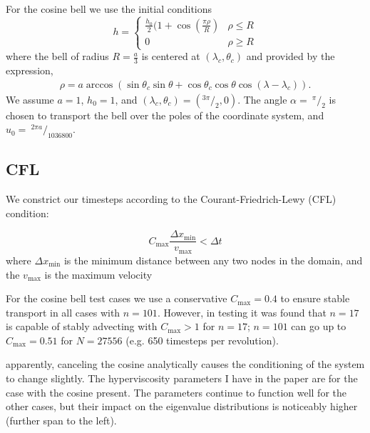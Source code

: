 \documentclass{report}
\begin{document}
For the cosine bell we use the initial conditions
\begin{equation*}
h  = 
\begin{cases} 
\frac{h_0}{2} (1 + \cos(\frac{\pi \rho}{R})  & \rho \le R  \\
 0 &  \rho \geq R 
\end{cases}
\end{equation*}
where the bell of radius $R = \frac{a}{3}$ is centered at $(\lambda_c, \theta_c)$ and provided by the expression,
\begin{eqnarray*}
\rho = a \arccos( \sin \theta_{c} \sin \theta + \cos \theta_{c} \cos \theta \cos (\lambda - \lambda_{c}) ).
\end{eqnarray*}
We assume $a = 1$, $h_0 = 1$, and $(\lambda_c, \theta_c) = (^{3\pi}/_{2}, 0)$. The angle $\alpha =\ ^{\pi}/_{2}$ is chosen to transport the bell over the poles of the coordinate system, and $u_0 =\ ^{2 \pi a}/_{1036800}$. 



\subsection{CFL}
We constrict our timesteps according to the Courant-Friedrich-Lewy (CFL) condition: 

$$
C_{\text{max}} \frac{\Delta x_{\text{min}}}{v_{\text{max}}} < \Delta t
$$
where $\Delta x_{\text{min}}$ is the minimum distance between any two nodes in the domain, and the $v_{\text{max}}$ is the maximum velocity 

For the cosine bell test cases we use a conservative $C_{\text{max}} = 0.4$ to ensure stable transport in all cases with $n=101$. However, in testing it was found that $n=17$ is capable of stably advecting with $C_{\text{max}} > 1$ for $n=17$; $n=101$ can go up to $C_{\text{max}} = 0.51$ for $N=27556$ (e.g. 650 timesteps per revolution). 


apparently, canceling the cosine analytically causes the conditioning of the system to change slightly. The hyperviscosity parameters I have in the paper are for the case with the cosine present. The parameters continue to function well for the other cases, but their impact on the eigenvalue distributions is noticeably higher (further span to the left). 


\ifstandalone


\end{document}
